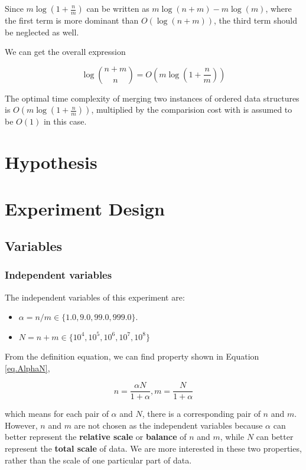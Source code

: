 \documentclass[12pt]{article}
\begin{document}
Since $m\log (1+\frac{n}{m})$ can be written as $m\log(n+m) - m\log(m)$, where the first term is more dominant than $O(\log (n+m))$, the third term should be neglected as well.

We can get the overall expression

\begin{equation}
    \boxed{\log \binom{n+m}{n} = O(m\log(1+\frac{n}{m}))}
\end{equation}

\begin{tcolorbox}[title = Theorem]
    The optimal time complexity of merging two instances of ordered data structures is $O(m\log(1+\frac{n}{m}))$, multiplied by the comparision cost with is assumed to be $O(1)$ in this case.
\end{tcolorbox}

\section{Hypothesis}

\section{Experiment Design}

\subsection{Variables}

\subsubsection{Independent variables}

The independent variables of this experiment are:

\begin{itemize}
    \item $\alpha = n/m \in\{1.0, 9.0, 99.0, 999.0\}$.
    \item $N = n+m \in\{10^4, 10^5, 10^6, 10^7, 10^8\}$
\end{itemize}

From the definition equation, we can find property shown in Equation \ref{eq.AlphaN},

\begin{equation}
    \label{eq.AlphaN}
    n = \dfrac{\alpha N}{1+\alpha}, m = \dfrac{N}{1+\alpha}
\end{equation}

which means for each pair of $\alpha$ and $N$, there is a corresponding pair of $n$ and $m$. However, $n$ and $m$ are not chosen as the independent variables because $\alpha$ can better represent the \textbf{relative scale} or \textbf{balance} of $n$ and $m$, while $N$ can better represent the \textbf{total scale} of data. We are more interested in these two properties, rather than the scale of one particular part of data.
\end{document}
